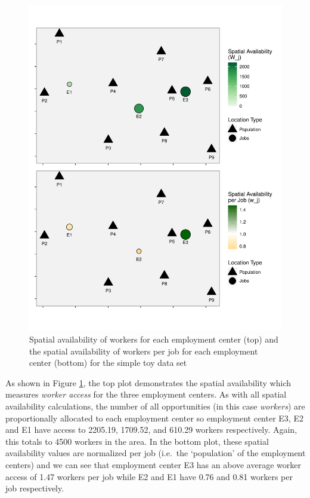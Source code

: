 \documentclass[]{elsarticle} %
\begin{document}
\begin{figure}
\includegraphics[width=1\linewidth]{Spatial-Availability_files/figure-latex/toy-example-availability-workers-per-job-1} \caption{\label{fig:toy-example-availability-workers-per-job} Spatial availability of workers for each employment center (top) and the spatial availability of workers per job for each employment center (bottom) for the simple toy data set}\label{fig:toy-example-availability-workers-per-job}
\end{figure}

As shown in Figure \ref{fig:toy-example-availability-workers-per-job},
the top plot demonstrates the spatial availability which measures
\emph{worker access} for the three employment centers. As with all
spatial availability calculations, the number of all opportunities (in
this case \emph{workers}) are proportionally allocated to each
employment center so employment center E3, E2 and E1 have access to
2205.19, 1709.52, and 610.29 workers respectively. Again, this totals to
4500 workers in the area. In the bottom plot, these spatial availability
values are normalized per job (i.e.~the `population' of the employment
centers) and we can see that employment center E3 has an above average
worker access of 1.47 workers per job while E2 and E1 have 0.76 and 0.81
workers per job respectively.
\end{document}

